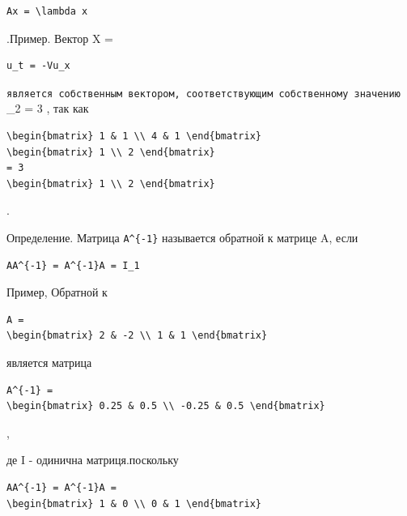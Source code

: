 \documentclass[
  ukrainian,
]{article}
\begin{document}
\begin{verbatim}
Ax = \lambda x
\end{verbatim}

.Пример. Вектор X =

\begin{verbatim}
u_t = -Vu_x
\end{verbatim}

\texttt{является\ собственным\ вектором,\ соответствующим\ собственному\ значению}
\lambda\_2 = 3 , так как

\begin{verbatim}
\begin{bmatrix} 1 & 1 \\ 4 & 1 \end{bmatrix}
\begin{bmatrix} 1 \\ 2 \end{bmatrix}
= 3
\begin{bmatrix} 1 \\ 2 \end{bmatrix}
\end{verbatim}

.

Определение. Матрица \texttt{A\^{}\{-1\}} называется обратной к матрице
A, если

\begin{verbatim}
AA^{-1} = A^{-1}A = I_1
\end{verbatim}

Пример, Обратной к

\begin{verbatim}
A =
\begin{bmatrix} 2 & -2 \\ 1 & 1 \end{bmatrix}
\end{verbatim}

является матрица

\begin{verbatim}
A^{-1} =
\begin{bmatrix} 0.25 & 0.5 \\ -0.25 & 0.5 \end{bmatrix}
\end{verbatim}

,

де I - одинична матриця.поскольку

\begin{verbatim}
AA^{-1} = A^{-1}A =
\begin{bmatrix} 1 & 0 \\ 0 & 1 \end{bmatrix}
\end{verbatim}
\end{document}
